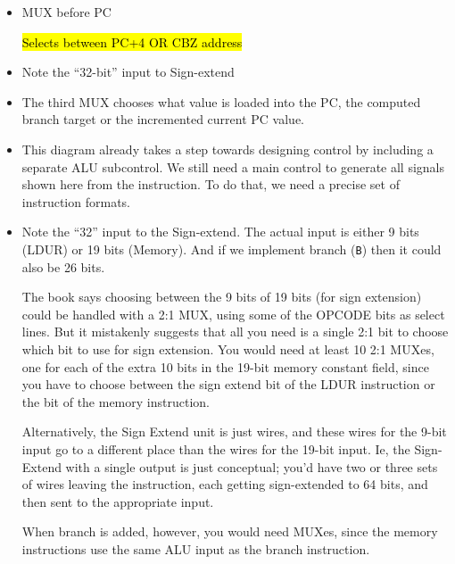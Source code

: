 \newpage
\begin{frame}[fragile]

\begin{itemize}
\item MUX before PC

  \hl{Selects between PC+4 OR CBZ address}
  \item Note the ``32-bit'' input to Sign-extend
\end{itemize}
\BNotes\ifnum{}
\begin{itemize}
\item The third MUX chooses what value is loaded into the PC, the
computed branch target or the incremented current PC value.
\item This diagram already takes a step towards designing control by
including a separate ALU subcontrol. We still need a main control to
generate all signals shown here from the instruction. To do that, we
need a precise set of instruction formats. 

\item Note the ``32'' input to the Sign-extend.  The actual input is either
  9 bits (LDUR) or 19 bits (Memory).  And if we implement branch ({\tt B}) then
  it could also be 26 bits.

  The book says choosing between the 9 bits of 19 bits (for sign extension)
  could be handled with a 2:1 MUX, using some of the OPCODE bits as select
  lines.  But it mistakenly suggests that all you need is a single 2:1
  bit to choose which bit to use for sign extension.  You would need at
  least 10 2:1 MUXes, one for each of the extra 10 bits in the 19-bit
  memory constant field, since you have to choose between the sign extend
  bit of the LDUR instruction or the bit of the memory instruction.

  Alternatively, the
  Sign Extend unit is just wires, and these wires for the 9-bit input go
  to a different place than the wires for the 19-bit input.
  Ie, the Sign-Extend with a
  single output is just conceptual; you'd have two or three sets of wires
  leaving the instruction, each getting sign-extended to 64 bits, and then
  sent to the appropriate input.

  When branch is added, however, you would need MUXes, since the memory
  instructions use the same ALU input as the branch instruction.
\end{itemize}
\fi\ENotes
\end{frame}

